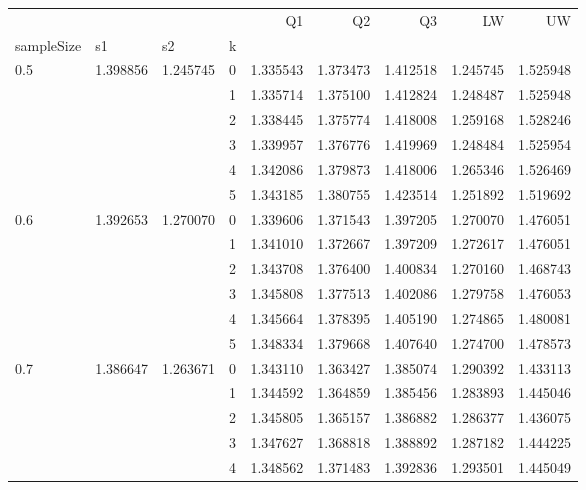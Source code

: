 \begin{tabular}{llllrrrrr}
\toprule
    &          &          &   &        Q1 &        Q2 &        Q3 &        LW &        UW \\
sampleSize & s1 & s2 & k &           &           &           &           &           \\
\midrule
0.5 & 1.398856 & 1.245745 & 0 &  1.335543 &  1.373473 &  1.412518 &  1.245745 &  1.525948 \\
    &          &          & 1 &  1.335714 &  1.375100 &  1.412824 &  1.248487 &  1.525948 \\
    &          &          & 2 &  1.338445 &  1.375774 &  1.418008 &  1.259168 &  1.528246 \\
    &          &          & 3 &  1.339957 &  1.376776 &  1.419969 &  1.248484 &  1.525954 \\
    &          &          & 4 &  1.342086 &  1.379873 &  1.418006 &  1.265346 &  1.526469 \\
    &          &          & 5 &  1.343185 &  1.380755 &  1.423514 &  1.251892 &  1.519692 \\
0.6 & 1.392653 & 1.270070 & 0 &  1.339606 &  1.371543 &  1.397205 &  1.270070 &  1.476051 \\
    &          &          & 1 &  1.341010 &  1.372667 &  1.397209 &  1.272617 &  1.476051 \\
    &          &          & 2 &  1.343708 &  1.376400 &  1.400834 &  1.270160 &  1.468743 \\
    &          &          & 3 &  1.345808 &  1.377513 &  1.402086 &  1.279758 &  1.476053 \\
    &          &          & 4 &  1.345664 &  1.378395 &  1.405190 &  1.274865 &  1.480081 \\
    &          &          & 5 &  1.348334 &  1.379668 &  1.407640 &  1.274700 &  1.478573 \\
0.7 & 1.386647 & 1.263671 & 0 &  1.343110 &  1.363427 &  1.385074 &  1.290392 &  1.433113 \\
    &          &          & 1 &  1.344592 &  1.364859 &  1.385456 &  1.283893 &  1.445046 \\
    &          &          & 2 &  1.345805 &  1.365157 &  1.386882 &  1.286377 &  1.436075 \\
    &          &          & 3 &  1.347627 &  1.368818 &  1.388892 &  1.287182 &  1.444225 \\
    &          &          & 4 &  1.348562 &  1.371483 &  1.392836 &  1.293501 &  1.445049 \\

\end{tabular}
